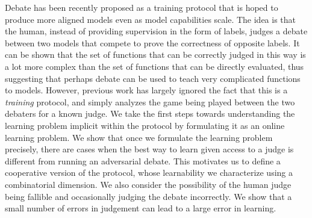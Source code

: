 Debate has been recently proposed as a training protocol that is hoped to
produce more aligned models even as model capabilities scale. The idea is
that the human, instead of providing supervision in the form of labels,
judges a debate between two models that compete to prove the correctness of
opposite labels. It can be shown that the set of functions that can be
correctly judged in this way is a lot more complex than the set of functions
that can be directly evaluated, thus suggesting that perhaps debate can be
used to teach very complicated functions to models. However, previous work
has largely ignored the fact that this is a \emph{training} protocol, and
simply analyzes the game being played between the two debaters for a known
judge. We take the first steps towards understanding the learning problem
implicit within the protocol by formulating it as an online learning
problem. We show that once we formulate the learning problem precisely,
there are cases when the best way to learn given access to a judge is
different from running an adversarial debate. This motivates us to define a
cooperative version of the protocol, whose learnability we characterize
using a combinatorial dimension. We also consider the possibility of the
human judge being fallible and occasionally judging the debate incorrectly.
We show that a small number of errors in judgement can lead to a large error
in learning.
